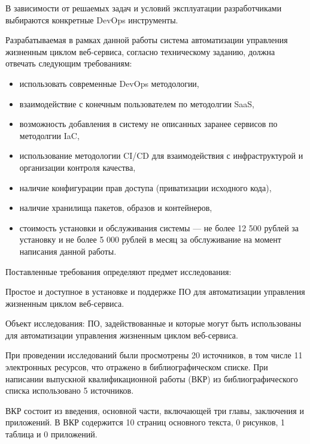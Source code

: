 В зависимости от решаемых задач и условий эксплуатации разработчиками выбираются конкретные DevOps инструменты.

Разрабатываемая в рамках данной работы система автоматизации управления жизненным циклом веб-сервиса,
согласно техническому заданию, должна отвечать следующим требованиям:

\begin{itemize}
    \item использовать современные DevOps методологии,
    \item взаимодействие с конечным пользователем по методолгии SaaS,
    \item возможность добавления в систему не описанных заранее сервисов по методолгии IaC,
    \item использование методологии CI/CD для взаимодействия с инфраструктурой и организации контроля качества,
    \item наличие конфигурации прав доступа (приватизации исходного кода),
    \item наличие хранилища пакетов, образов и контейнеров,
    \item стоимость установки и обслуживания системы --- не более 12 500 рублей за установку и не более 5 000 рублей в месяц за обслуживание на момент написания данной работы.
\end{itemize}

Поставленные требования определяют предмет исследования:

Простое и доступное в установке и поддержке ПО для автоматизации управления жизненным циклом веб-сервиса.

Объект исследования: ПО, задействованные и которые могут быть использованы для автоматизации управления жизненным циклом веб-сервиса.

При проведении исследований были просмотрены 20 источников, в том числе 11 электронных ресурсов, что отражено в библиографическом списке.
При написании выпускной квалификационной работы (ВКР) из библиографического списка использовано 5 источников.

ВКР состоит из введения, основной части, включающей три главы, заключения и приложений.
В ВКР содержится 10 страниц основного текста, 0 рисунков, 1 таблица и 0 приложений.